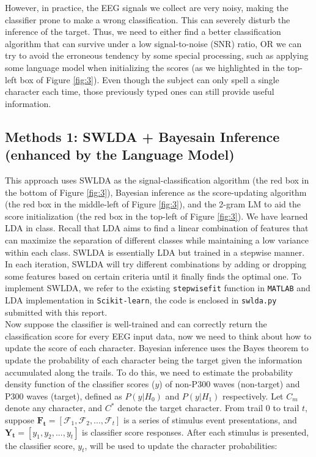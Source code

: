 \documentclass{article}
\begin{document}
\vspace{-3mm}
However, in practice, the EEG signals we collect are very noisy, making the classifier prone to make a wrong classification. This can severely disturb the inference of the target. Thus, we need to either find a better classification algorithm that can survive under a low signal-to-noise (SNR) ratio, OR we can try to avoid the erroneous tendency by some special processing, such as applying some language model when initializing the scores (as we highlighted in the top-left box of Figure \ref{fig:3}). Even though the subject can only spell a single character each time, those previously typed ones can still provide useful information.



\subsection{Methods 1: SWLDA + Bayesain Inference (enhanced by the Language Model)} \label{SWLDA}
This approach uses SWLDA as the signal-classification algorithm (the red box in the bottom of Figure \ref{fig:3}), Bayesian inference as the score-updating algorithm (the red box in the middle-left of Figure \ref{fig:3}), and the 2-gram LM to aid the score initialization (the red box in the top-left of Figure \ref{fig:3}). We have learned LDA in class. Recall that LDA aims to find a linear combination of features that can maximize the separation of different classes while maintaining a low variance within each class. SWLDA is essentially LDA but trained in a stepwise manner. In each iteration, SWLDA will try different combinations by adding or dropping some features based on certain criteria until it finally finds the optimal one. To implement SWLDA, we refer to the existing \texttt{stepwisefit} function in \texttt{MATLAB} and LDA implementation in \texttt{Scikit-learn}, the code is enclosed in \texttt{swlda.py} submitted with this report.\\

\vspace{-3mm}
Now suppose the classifier is well-trained and can correctly return the classification score for every EEG input data, now we need to think about how to update the score of each character. Bayesian inference uses the Bayes theorem to update the probability of each character being the target given the information accumulated along the trails. To do this, we need to estimate the probability density function of the classifier scores ($y$) of non-P300 waves (non-target) and P300 waves (target), defined as $P(y|H_0)$ and $P(y|H_1)$ respectively. Let $C_m$ denote any character, and $C^*$ denote the target character. From trail $0$ to trail $t$, suppose $\boldsymbol{F_t}=[\mathcal{F}_1, \mathcal{F}_2, ..., \mathcal{F}_t]$ is a series of stimulus event presentations, and $\mathbf{Y_t} = [y_1, y_2, ..., y_t]$ is classifier score responses. After each stimulus is presented, the classifier score, $y_t$, will be used to update the character probabilities:
\end{document}
